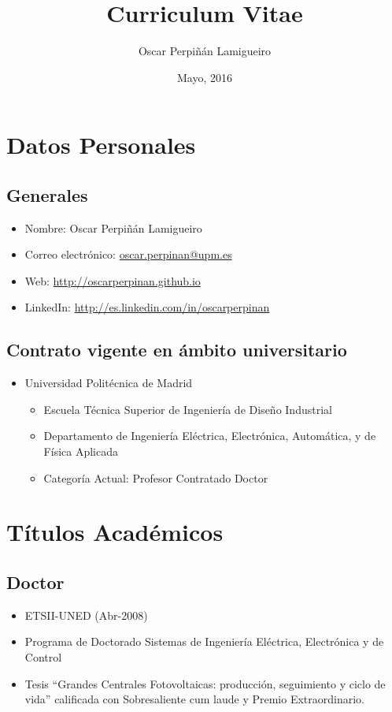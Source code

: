 \documentclass[article, a4paper]{memoir}
\author{Oscar Perpiñán Lamigueiro}
\date{Mayo, 2016}
\title{Curriculum Vitae}
\begin{document}
\maketitle
\tableofcontents


\section{Datos Personales}
\label{sec:orgce08412}

\subsection{Generales}
\label{sec:org810b34b}

\begin{itemize}
\item Nombre: Oscar Perpiñán Lamigueiro
\item Correo electrónico: \href{mailto:oscar.perpinan@upm.es}{oscar.perpinan@upm.es}
\item Web: \url{http://oscarperpinan.github.io}
\item LinkedIn: \url{http://es.linkedin.com/in/oscarperpinan}
\end{itemize}

\subsection{Contrato vigente en ámbito universitario}
\label{sec:org9b3f55e}

\begin{itemize}
\item Universidad Politécnica de Madrid
\begin{itemize}
\item Escuela Técnica Superior de Ingeniería de Diseño Industrial
\item Departamento de Ingeniería Eléctrica, Electrónica, Automática, y de Física Aplicada
\item Categoría Actual: Profesor Contratado Doctor
\end{itemize}
\end{itemize}


\section{Títulos Académicos}
\label{sec:orgfc7ea98}

\subsection{Doctor}
\label{sec:org5108f40}
\begin{itemize}
\item ETSII-UNED (Abr-2008)
\item Programa de Doctorado \guillemotleft{}Sistemas de Ingeniería Eléctrica, Electrónica y de Control\guillemotright{}
\item Tesis ``Grandes Centrales Fotovoltaicas: producción, seguimiento y ciclo de vida'' calificada con Sobresaliente cum laude y Premio Extraordinario.
\end{itemize}
\end{document}
